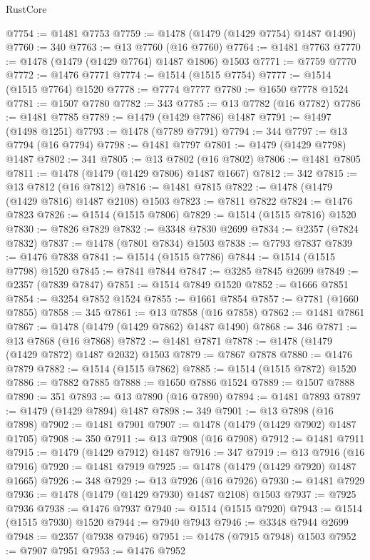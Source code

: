 \begin{lexlean}{RustCore}
\begin{coremodule}
@7754 := @1481 @7753
@7759 := @1478 (@1479 (@1429 @7754) @1487 @1490)
@7760 := 340
@7763 := @13 @7760 (@16 @7760)
@7764 := @1481 @7763
@7770 := @1478 (@1479 (@1429 @7764) @1487 @1806) @1503
@7771 := @7759 @7770
@7772 := @1476 @7771
@7774 := @1514 (@1515 @7754)
@7777 := @1514 (@1515 @7764) @1520
@7778 := @7774 @7777
@7780 := @1650 @7778 @1524
@7781 := @1507 @7780
@7782 := 343
@7785 := @13 @7782 (@16 @7782)
@7786 := @1481 @7785
@7789 := @1479 (@1429 @7786) @1487
@7791 := @1497 (@1498 @1251)
@7793 := @1478 (@7789 @7791)
@7794 := 344
@7797 := @13 @7794 (@16 @7794)
@7798 := @1481 @7797
@7801 := @1479 (@1429 @7798) @1487
@7802 := 341
@7805 := @13 @7802 (@16 @7802)
@7806 := @1481 @7805
@7811 := @1478 (@1479 (@1429 @7806) @1487 @1667)
@7812 := 342
@7815 := @13 @7812 (@16 @7812)
@7816 := @1481 @7815
@7822 := @1478 (@1479 (@1429 @7816) @1487 @2108) @1503
@7823 := @7811 @7822
@7824 := @1476 @7823
@7826 := @1514 (@1515 @7806)
@7829 := @1514 (@1515 @7816) @1520
@7830 := @7826 @7829
@7832 := @3348 @7830 @2699
@7834 := @2357 (@7824 @7832)
@7837 := @1478 (@7801 @7834) @1503
@7838 := @7793 @7837
@7839 := @1476 @7838
@7841 := @1514 (@1515 @7786)
@7844 := @1514 (@1515 @7798) @1520
@7845 := @7841 @7844
@7847 := @3285 @7845 @2699
@7849 := @2357 (@7839 @7847)
@7851 := @1514 @7849 @1520
@7852 := @1666 @7851
@7854 := @3254 @7852 @1524
@7855 := @1661 @7854
@7857 := @7781 (@1660 @7855)
@7858 := 345
@7861 := @13 @7858 (@16 @7858)
@7862 := @1481 @7861
@7867 := @1478 (@1479 (@1429 @7862) @1487 @1490)
@7868 := 346
@7871 := @13 @7868 (@16 @7868)
@7872 := @1481 @7871
@7878 := @1478 (@1479 (@1429 @7872) @1487 @2032) @1503
@7879 := @7867 @7878
@7880 := @1476 @7879
@7882 := @1514 (@1515 @7862)
@7885 := @1514 (@1515 @7872) @1520
@7886 := @7882 @7885
@7888 := @1650 @7886 @1524
@7889 := @1507 @7888
@7890 := 351
@7893 := @13 @7890 (@16 @7890)
@7894 := @1481 @7893
@7897 := @1479 (@1429 @7894) @1487
@7898 := 349
@7901 := @13 @7898 (@16 @7898)
@7902 := @1481 @7901
@7907 := @1478 (@1479 (@1429 @7902) @1487 @1705)
@7908 := 350
@7911 := @13 @7908 (@16 @7908)
@7912 := @1481 @7911
@7915 := @1479 (@1429 @7912) @1487
@7916 := 347
@7919 := @13 @7916 (@16 @7916)
@7920 := @1481 @7919
@7925 := @1478 (@1479 (@1429 @7920) @1487 @1665)
@7926 := 348
@7929 := @13 @7926 (@16 @7926)
@7930 := @1481 @7929
@7936 := @1478 (@1479 (@1429 @7930) @1487 @2108) @1503
@7937 := @7925 @7936
@7938 := @1476 @7937
@7940 := @1514 (@1515 @7920)
@7943 := @1514 (@1515 @7930) @1520
@7944 := @7940 @7943
@7946 := @3348 @7944 @2699
@7948 := @2357 (@7938 @7946)
@7951 := @1478 (@7915 @7948) @1503
@7952 := @7907 @7951
@7953 := @1476 @7952

\end{coremodule}
\end{lexlean}
